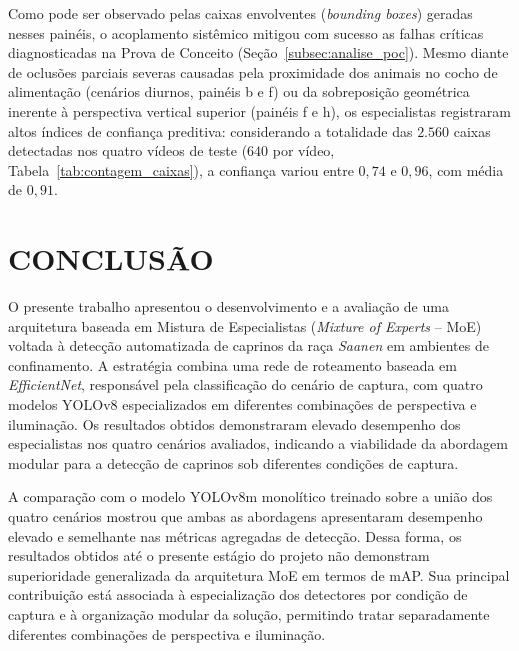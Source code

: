 \documentclass[12pt,fleqn]{article}
\begin{document}
Como pode ser observado pelas caixas envolventes (\textit{bounding boxes}) geradas nesses painéis, o acoplamento sistêmico mitigou com sucesso as falhas críticas diagnosticadas na Prova de Conceito (Seção~\ref{subsec:analise_poc}). Mesmo diante de oclusões parciais severas causadas pela proximidade dos animais no cocho de alimentação (cenários diurnos, painéis b e f) ou da sobreposição geométrica inerente à perspectiva vertical superior (painéis f e h), os especialistas registraram altos índices de confiança preditiva: considerando a totalidade das $2.560$ caixas detectadas nos quatro vídeos de teste ($640$ por vídeo, Tabela~\ref{tab:contagem_caixas}), a confiança variou entre $0,74$ e $0,96$, com média de $0,91$.


\section{CONCLUSÃO}

O presente trabalho apresentou o desenvolvimento e a avaliação de uma arquitetura baseada em Mistura de Especialistas (\textit{Mixture of Experts} -- MoE) voltada à detecção automatizada de caprinos da raça \textit{Saanen} em ambientes de confinamento. A estratégia combina uma rede de roteamento baseada em \textit{EfficientNet}, responsável pela classificação do cenário de captura, com quatro modelos YOLOv8 especializados em diferentes combinações de perspectiva e iluminação. Os resultados obtidos demonstraram elevado desempenho dos especialistas nos quatro cenários avaliados, indicando a viabilidade da abordagem modular para a detecção de caprinos sob diferentes condições de captura.

A comparação com o modelo YOLOv8m monolítico treinado sobre a união dos quatro cenários mostrou que ambas as abordagens apresentaram desempenho elevado e semelhante nas métricas agregadas de detecção. Dessa forma, os resultados obtidos até o presente estágio do projeto não demonstram superioridade generalizada da arquitetura MoE em termos de mAP. Sua principal contribuição está associada à especialização dos detectores por condição de captura e à organização modular da solução, permitindo tratar separadamente diferentes combinações de perspectiva e iluminação.
\end{document}
